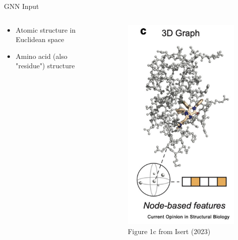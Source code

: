\documentclass{beamer}
\begin{document}
\begin{frame}{GNN Input}
    \begin{columns}
        \begin{column}{0.7\textwidth}
            \begin{itemize}
                \item Atomic structure in Euclidean space 
                \item Amino acid (also "residue") structure 
            \end{itemize}            
        \end{column}
        \begin{column}{0.3\textwidth}
            \begin{figure}
                \centering 
                \includegraphics[scale=0.55]{Isert_2023_ModelsSBDD_3DGraph.png}
            \caption{Figure 1c from Isert (2023) \cite{isert_structure-based_2023}}
        \end{figure}
                    
        \end{column}
    \end{columns}
\end{frame}
\end{document}
